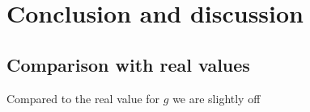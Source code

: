 \section{Conclusion and discussion}

\subsection{Comparison with real values}
Compared to the real value for $g$ we are slightly off